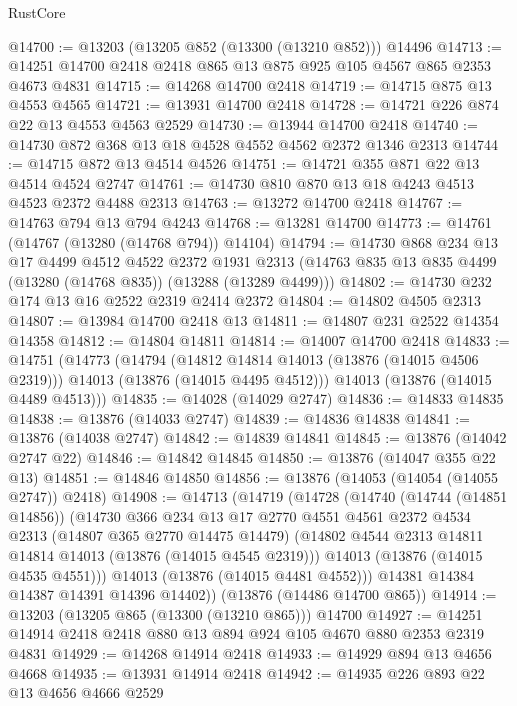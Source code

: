 \begin{lexlean}{RustCore}
\begin{coremodule}
@14700 := @13203 (@13205 @852 (@13300 (@13210 @852))) @14496
@14713 := @14251 @14700 @2418 @2418 @865 @13 @875 @925 @105 @4567 @865 @2353 @4673 @4831
@14715 := @14268 @14700 @2418
@14719 := @14715 @875 @13 @4553 @4565
@14721 := @13931 @14700 @2418
@14728 := @14721 @226 @874 @22 @13 @4553 @4563 @2529
@14730 := @13944 @14700 @2418
@14740 := @14730 @872 @368 @13 @18 @4528 @4552 @4562 @2372 @1346 @2313
@14744 := @14715 @872 @13 @4514 @4526
@14751 := @14721 @355 @871 @22 @13 @4514 @4524 @2747
@14761 := @14730 @810 @870 @13 @18 @4243 @4513 @4523 @2372 @4488 @2313
@14763 := @13272 @14700 @2418
@14767 := @14763 @794 @13 @794 @4243
@14768 := @13281 @14700
@14773 := @14761 (@14767 (@13280 (@14768 @794)) @14104)
@14794 := @14730
    @868
    @234
    @13
    @17
    @4499
    @4512
    @4522
    @2372
    @1931
    @2313
    (@14763 @835 @13 @835 @4499 (@13280 (@14768 @835)) (@13288 (@13289 @4499)))
@14802 := @14730 @232 @174 @13 @16 @2522 @2319 @2414 @2372
@14804 := @14802 @4505 @2313
@14807 := @13984 @14700 @2418 @13
@14811 := @14807 @231 @2522 @14354 @14358
@14812 := @14804 @14811
@14814 := @14007 @14700 @2418
@14833 := @14751
    (@14773
      (@14794
        (@14812 @14814 @14013 (@13876 (@14015 @4506 @2319)))
        @14013
        (@13876 (@14015 @4495 @4512)))
      @14013
      (@13876 (@14015 @4489 @4513)))
@14835 := @14028 (@14029 @2747)
@14836 := @14833 @14835
@14838 := @13876 (@14033 @2747)
@14839 := @14836 @14838
@14841 := @13876 (@14038 @2747)
@14842 := @14839 @14841
@14845 := @13876 (@14042 @2747 @22)
@14846 := @14842 @14845
@14850 := @13876 (@14047 @355 @22 @13)
@14851 := @14846 @14850
@14856 := @13876 (@14053 (@14054 (@14055 @2747)) @2418)
@14908 := @14713
    (@14719
      (@14728
        (@14740
          (@14744 (@14851 @14856))
          (@14730
            @366
            @234
            @13
            @17
            @2770
            @4551
            @4561
            @2372
            @4534
            @2313
            (@14807 @365 @2770 @14475 @14479)
            (@14802 @4544 @2313 @14811 @14814 @14013 (@13876 (@14015 @4545 @2319)))
            @14013
            (@13876 (@14015 @4535 @4551)))
          @14013
          (@13876 (@14015 @4481 @4552)))
        @14381
        @14384
        @14387
        @14391
        @14396
        @14402))
    (@13876 (@14486 @14700 @865))
@14914 := @13203 (@13205 @865 (@13300 (@13210 @865))) @14700
@14927 := @14251 @14914 @2418 @2418 @880 @13 @894 @924 @105 @4670 @880 @2353 @2319 @4831
@14929 := @14268 @14914 @2418
@14933 := @14929 @894 @13 @4656 @4668
@14935 := @13931 @14914 @2418
@14942 := @14935 @226 @893 @22 @13 @4656 @4666 @2529

\end{coremodule}
\end{lexlean}
